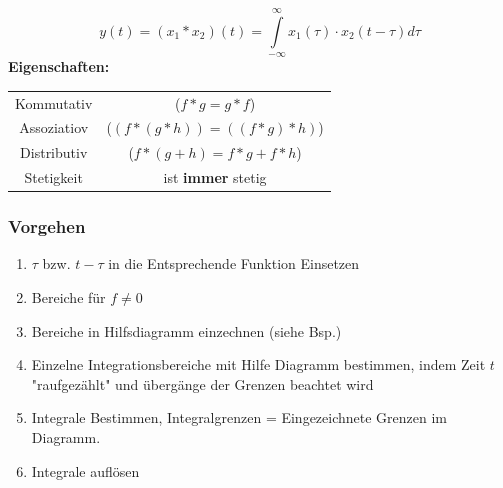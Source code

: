 \begin{multicols}{2}

  $$y(t) = (x_1 * x_2)(t) = \int \limits _{-\infty} ^{\infty} x_1(\tau) \cdot x_2(t-\tau) d\tau$$
  \textbf{Eigenschaften:} \\
  \begin{tabular}{cc}
    Kommutativ  & ($f * g = g * f$)         \\
    Assoziatiov & ($(f*(g*h)) = ((f*g)*h)$) \\
    Distributiv & ($f*(g+h)= f*g + f*h$)    \\
    Stetigkeit  & ist \textbf{immer} stetig
  \end{tabular}

  \subsubsection*{Vorgehen}
  \noindent
  \begin{enumerate}
    \item $\tau$ bzw. $t-\tau$ in die Entsprechende Funktion Einsetzen
    \item Bereiche für $f \neq 0$
    \item Bereiche in Hilfsdiagramm einzechnen (siehe Bsp.)
    \item Einzelne Integrationsbereiche mit Hilfe Diagramm bestimmen,
          indem Zeit $t$ "raufgezählt" und übergänge der Grenzen beachtet wird
    \item Integrale Bestimmen, Integralgrenzen = Eingezeichnete Grenzen im Diagramm.
    \item Integrale auflösen
  \end{enumerate}




\end{multicols}
